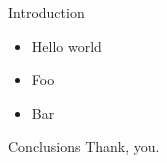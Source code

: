 \begin{frame}
	\maketitle
\end{frame}

\begin{frame}{Introduction}

	\begin{itemize}
		\item Hello world
		\item Foo
		\item Bar
	\end{itemize}
\end{frame}

\begin{frame}{Conclusions}
	Thank, you.

	\cite{jepsen2014}
\end{frame}

\begin{frame}
	\maketitle
\end{frame}
